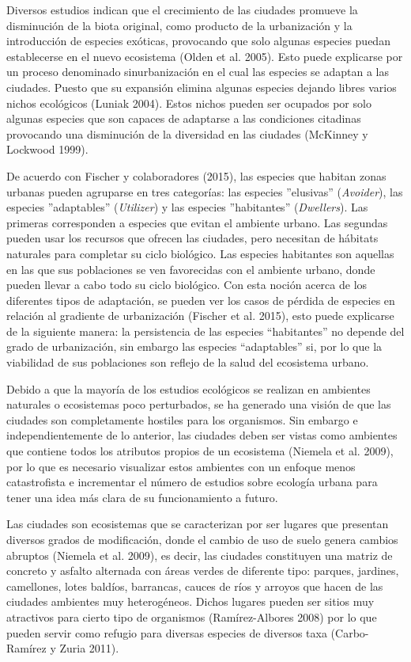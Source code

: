 \documentclass[letterpaper,12pt]{article}
\begin{document}
Diversos estudios indican que el crecimiento de las ciudades promueve la disminución de la biota original, como producto de la urbanización y la introducción de especies exóticas, provocando que solo algunas especies puedan establecerse en el nuevo ecosistema (Olden et al. 2005). Esto puede explicarse por un proceso  denominado sinurbanización en el cual las especies se adaptan a las ciudades. Puesto que su expansión elimina algunas especies dejando libres varios nichos ecológicos (Luniak 2004). Estos nichos pueden ser ocupados por solo algunas especies que son capaces de  adaptarse a las condiciones citadinas provocando una  disminución de la diversidad en las ciudades (McKinney y Lockwood 1999).

De acuerdo con Fischer y colaboradores (2015), las especies que habitan zonas urbanas pueden agruparse en tres categorías: las especies ''elusivas'' (\textit{Avoider}), las especies ''adaptables'' (\textit{Utilizer}) y las especies ''habitantes'' (\textit{Dwellers}). Las primeras corresponden a especies que evitan el ambiente urbano. Las segundas pueden usar los recursos que ofrecen las ciudades, pero necesitan de hábitats naturales para completar su ciclo biológico. Las especies habitantes son aquellas en las que sus poblaciones se ven favorecidas con el ambiente urbano, donde pueden llevar a cabo todo su ciclo biológico. Con esta noción acerca de los diferentes tipos de adaptación, se pueden ver los casos de pérdida de especies en relación al gradiente de urbanización (Fischer et al. 2015), esto puede explicarse de la siguiente manera: la persistencia de las especies ``habitantes'' no depende del grado de urbanización, sin embargo las especies ``adaptables'' si, por lo que la viabilidad de sus poblaciones son reflejo de la salud del ecosistema urbano.

Debido a que la mayoría de los estudios ecológicos se realizan en ambientes naturales o ecosistemas poco perturbados, se ha generado una visión de que las ciudades son completamente hostiles para los organismos. Sin embargo e independientemente de lo anterior, las ciudades deben ser vistas como ambientes que contiene todos los atributos propios de un ecosistema (Niemela et al. 2009), por lo que es necesario visualizar estos ambientes con un enfoque menos catastrofista e incrementar el número de estudios sobre ecología urbana para tener una idea más clara de su funcionamiento a futuro.

Las ciudades son ecosistemas que se caracterizan por ser lugares que presentan diversos grados de modificación, donde el cambio de uso de suelo genera  cambios abruptos (Niemela et al. 2009), es decir, las ciudades constituyen una matriz de concreto y asfalto alternada con áreas verdes de diferente tipo: parques, jardines, camellones, lotes baldíos, barrancas, cauces de ríos y arroyos que hacen de las ciudades ambientes  muy heterogéneos. Dichos lugares pueden ser sitios muy atractivos para cierto tipo de organismos (Ramírez-Albores 2008) por lo que pueden servir como refugio para diversas especies de diversos taxa (Carbo-Ramírez y Zuria 2011).
\end{document}
